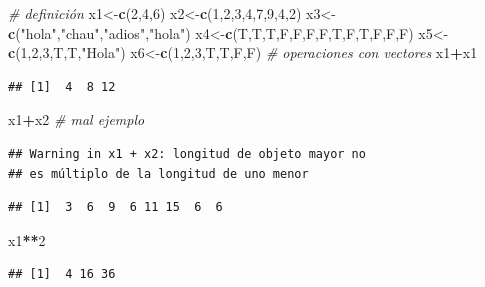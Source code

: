 \documentclass[
]{book}
\newenvironment{Shaded}{\begin{snugshade}}{\end{snugshade}}
\newcommand{\CommentTok}[1]{\textcolor[rgb]{0.56,0.35,0.01}{\textit{#1}}}
\newcommand{\DecValTok}[1]{\textcolor[rgb]{0.00,0.00,0.81}{#1}}
\newcommand{\KeywordTok}[1]{\textcolor[rgb]{0.13,0.29,0.53}{\textbf{#1}}}
\newcommand{\NormalTok}[1]{#1}
\newcommand{\OperatorTok}[1]{\textcolor[rgb]{0.81,0.36,0.00}{\textbf{#1}}}
\newcommand{\StringTok}[1]{\textcolor[rgb]{0.31,0.60,0.02}{#1}}
\begin{document}
\begin{Shaded}
\begin{Highlighting}[]
\CommentTok{# definición}
\NormalTok{x1<-}\KeywordTok{c}\NormalTok{(}\DecValTok{2}\NormalTok{,}\DecValTok{4}\NormalTok{,}\DecValTok{6}\NormalTok{)}
\NormalTok{x2<-}\KeywordTok{c}\NormalTok{(}\DecValTok{1}\NormalTok{,}\DecValTok{2}\NormalTok{,}\DecValTok{3}\NormalTok{,}\DecValTok{4}\NormalTok{,}\DecValTok{7}\NormalTok{,}\DecValTok{9}\NormalTok{,}\DecValTok{4}\NormalTok{,}\DecValTok{2}\NormalTok{)}
\NormalTok{x3<-}\KeywordTok{c}\NormalTok{(}\StringTok{"hola"}\NormalTok{,}\StringTok{"chau"}\NormalTok{,}\StringTok{"adios"}\NormalTok{,}\StringTok{"hola"}\NormalTok{)}
\NormalTok{x4<-}\KeywordTok{c}\NormalTok{(T,T,T,F,F,F,F,T,F,T,F,F,F)}
\NormalTok{x5<-}\KeywordTok{c}\NormalTok{(}\DecValTok{1}\NormalTok{,}\DecValTok{2}\NormalTok{,}\DecValTok{3}\NormalTok{,T,T,}\StringTok{"Hola"}\NormalTok{)}
\NormalTok{x6<-}\KeywordTok{c}\NormalTok{(}\DecValTok{1}\NormalTok{,}\DecValTok{2}\NormalTok{,}\DecValTok{3}\NormalTok{,T,T,F,F)}
\CommentTok{# operaciones con vectores}
\NormalTok{x1}\OperatorTok{+}\NormalTok{x1}
\end{Highlighting}
\end{Shaded}

\begin{verbatim}
## [1]  4  8 12
\end{verbatim}

\begin{Shaded}
\begin{Highlighting}[]
\NormalTok{x1}\OperatorTok{+}\NormalTok{x2 }\CommentTok{# mal ejemplo}
\end{Highlighting}
\end{Shaded}

\begin{verbatim}
## Warning in x1 + x2: longitud de objeto mayor no
## es múltiplo de la longitud de uno menor
\end{verbatim}

\begin{verbatim}
## [1]  3  6  9  6 11 15  6  6
\end{verbatim}

\begin{Shaded}
\begin{Highlighting}[]
\NormalTok{x1}\OperatorTok{**}\DecValTok{2}
\end{Highlighting}
\end{Shaded}

\begin{verbatim}
## [1]  4 16 36
\end{verbatim}
\end{document}

